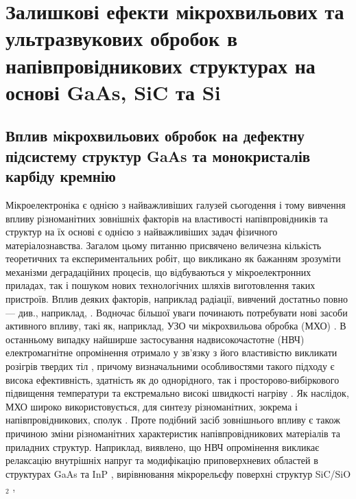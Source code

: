 
\chapter{Залишкові ефекти мікрохвильових та ультразвукових обробок в напівпровідникових структурах на основі GaAs, SiC та Si\label{Ch_UST_MW}}

\section{Вплив мікрохвильових обробок на дефектну підсистему структур GaAs та монокристалів карбіду кремнію}

Мікроелектроніка є однією з найважливіших галузей сьогодення і тому
вивчення впливу різноманітних зовнішніх факторів на властивості напівпровідників та структур на їх основі є однією з найважливіших задач фізичного матеріалознавства.
Загалом цьому питанню присвячено величезна кількість теоретичних та експериментальних робіт,
що викликано як бажанням зрозуміти механізми деградаційних процесів, що відбуваються у мікроелектронних приладах,
так і пошуком нових технологічних шляхів виготовлення таких пристроїв.
Вплив деяких факторів, наприклад радіації, вивчений достатньо повно --- див., наприклад, \cite{KorshunovBook,Kozlovs}.
Водночас більшої уваги починають потребувати нові засоби активного впливу, такі як, наприклад, УЗО чи мікрохвильова обробка (МХО) \cite{MW:Rev,Rjanov1981,paton1993,Vinnik1989,ZOHM2000,BHUNIA1998,Bacherikov2003r,Pashkov1994r,
Boltovets,Kr1996,Milenin1994,BelyaevIntac,ASHKINADZE1996,ProcSPIE,Venger1999,Belyaev1998JTFr,
Bacherikov2008,Konakova2015,Konakova2012FTP}.
В останньому випадку найширше застосування надвисокочастотне (НВЧ) електромагнітне опромінення отримало
у зв'язку з його властивістю викликати розігрів твердих тіл \cite{MW:Rev,ZOHM2000,paton1993}, причому визначальними особливостями такого підходу є висока ефективність, здатність як до однорідного, так і просторово-вибіркового підвищення температури та екстремально високі швидкості нагріву \cite{MW:Rev}.
Як наслідок, МХО широко використовується, для синтезу різноманітних, зокрема і напівпровідникових, сполук \cite{MW:Rev,BHUNIA1998}.
Проте подібний засіб зовнішнього впливу є також причиною зміни різноманітних характеристик напівпровідникових матеріалів та приладних структур.
Наприклад, виявлено, що НВЧ опромінення викликає релаксацію внутрішніх напруг та модифікацію приповерхневих
областей в структурах GaAs та InP \cite{Boltovets,Pashkov1994r,Kr1996,Milenin1994,BelyaevIntac,ProcSPIE,Venger1999,Konakova2015,Konakova2012FTP},
вирівнювання мікрорельєфу поверхні структур SiC/SiO$_2$ \cite{Bacherikov2003r},
